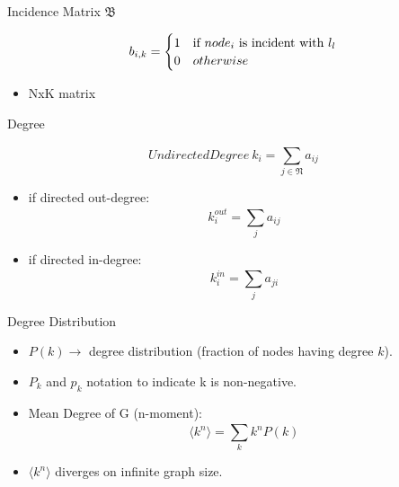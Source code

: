 \documentclass{beamer}
\begin{document}
\begin{frame}{Incidence Matrix $\mathfrak{B}$}

\[
 b_{i,k} =
 \begin{cases}
   1 & \text{if } node_i $ is incident with $ l_l \\
   0       & otherwise
  \end{cases}
\]

\begin{itemize}
 \item NxK matrix
\end{itemize}

\end{frame}

\begin{frame}{Degree}


\[
Undirected Degree\ k_i = \sum_{j\in\mathfrak{N}}^{} a_{ij}
\]

\begin{itemize}
 \item if directed out-degree: \[  k_i^{out} = \sum_{j}^{} a_{ij} \]
 \item if directed in-degree: \[  k_i^{in} = \sum_{j}^{} a_{ji} \]
\end{itemize}

\end{frame}




\begin{frame}{Degree Distribution}

\begin{itemize}
 \item $P(k) \rightarrow$ degree distribution (fraction of nodes having degree $k$).
 \item $P_k$ and $p_k$ notation to indicate k is non-negative.
 \item Mean Degree of G (n-moment): \[ \langle k^n \rangle = \sum_{k}^{} k^n P(k) \] 
 \item $ \langle k^n \rangle $ diverges on infinite graph size.
\end{itemize}

\end{frame}


\end{document}
